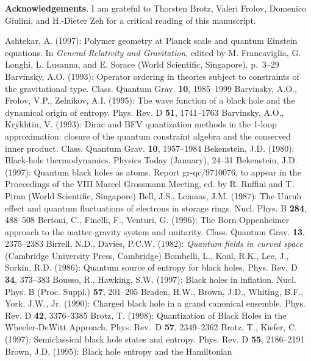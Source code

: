 \vskip 3mm
{\bf Acknowledgements}. I am grateful to Thorsten Brotz,
Valeri Frolov, Domenico
Giulini, and H.-Dieter Zeh for a critical reading of this
manuscript.
%
%
%
\begin{thebibliography}
%
\bibitem{}{}{}
Ashtekar, A. (1997): Polymer geometry at Planck scale and quantum
Einstein equations. In {\it General Relativity and Gravitation},
edited by M. Francaviglia, G. Longhi, L. Lusanna, and E. Sorace
(World Scientific, Singapore), p.~3--29
%
\bibitem{}{}{}
Barvinsky, A.O. (1993): Operator ordering in theories subject
to constraints of the gravitational type. Class. Quantum Grav.
{\bf 10}, 1985--1999
%
\bibitem{}{}{}
Barvinsky, A.O., Frolov, V.P., Zelnikov, A.I. (1995):
The wave function of a black hole and the dynamical origin
of entropy. Phys. Rev. D {\bf 51}, 1741--1763
%
\bibitem{}{}{}
Barvinsky, A.O., Krykhtin, V. (1993): Dirac and BFV quantization methods
in the 1-loop approximation: closure of the quantum constraint algebra
and the conserved inner product. Class. Quantum Grav. {\bf 10},
1957--1984
%
\bibitem{}{}{}
Bekenstein, J.D. (1980): Black-hole thermodynamics.
Physics Today (January), 24--31
%
\bibitem{}{}{}
Bekenstein, J.D. (1997): Quantum black holes as atoms. Report
gr-qc/9710076, to appear in the Proccedings of the VIII Marcel
Grossmann Meeting, ed. by R. Ruffini and T. Piran
(World Scientific, Singapore)
%
\bibitem{}{}{}
Bell, J.S., Leinaas, J.M. (1987): The Unruh effect and quantum
fluctuations of electrons in storage rings.
Nucl. Phys. B {\bf 284}, 488--508
%
\bibitem{}{}{}
Bertoni, C., Finelli, F., Venturi, G. (1996): The Born-Oppenheimer
approach to the matter-gravity system and unitarity.
Class. Quantum Grav. {\bf 13}, 2375--2383
%
\bibitem{}{}{}
Birrell, N.D., Davies, P.C.W. (1982): {\it Quantum fields
in curved space} (Cambridge University Press, Cambridge)
%
\bibitem{}{}{}
Bombelli, L., Koul, R.K., Lee, J., Sorkin, R.D. (1986):
Quantum source of entropy for black holes. 
Phys. Rev. D {\bf 34}, 373--383
%
\bibitem{}{}{}
Bousso, R., Hawking, S.W. (1997): Black holes in inflation.
Nucl. Phys. B (Proc. Suppl.) {\bf 57}, 201--205
%
\bibitem{}{}{}
Braden, H.W., Brown, J.D., Whiting, B.F., York, J.W., Jr. (1990):
Charged black hole in a grand canonical ensemble.
Phys. Rev. D {\bf 42}, 3376--3385
%
\bibitem{}{}{}
Brotz, T. (1998): Quantization of Black Holes in the Wheeler-DeWitt
Approach. Phys. Rev.~D {\bf 57}, 2349--2362
%
\bibitem{}{}{}
Brotz, T., Kiefer, C. (1997): Semiclassical black hole states
and entropy. Phys. Rev. D {\bf 55}, 2186--2191
% 
\bibitem{}{}{}
Brown, J.D. (1995): Black hole entropy and the Hamiltonian

\end{thebibliography}

